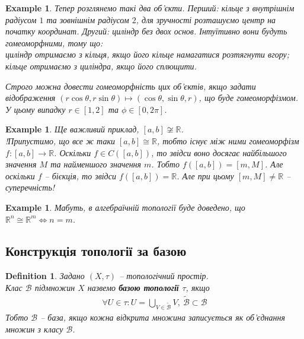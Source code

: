 \documentclass[a4paper, 10pt]{article}
\theoremstyle{theoremdd}
\newtheorem{definition}[theorem]{Definition}
\newtheorem{example}[theorem]{Example}
\begin{document}
\begin{example}
Тепер розглянемо такі два об'єкти. Перший: кільце з внутрішнім радіусом $1$ та зовнішнім радіусом $2$, для зручності розташуємо центр на початку координат. Другий: циліндр без двох основ. Інтуїтивно вони будуть гомеоморфними, тому що:\\
циліндр отримаємо з кільця, якщо його кільце намагатися розтягнути вгору;\\
кільце отримаємо з циліндра, якщо його сплющити.
\begin{figure}[H]
\centering
{}
\qquad
{}
\end{figure}
\noindent
Строго можна довести гомеоморфність цих об'єктів, якщо задати відображення $(r \cos \theta, r \sin \theta) \mapsto (\cos \theta, \sin \theta,r)$, що буде гомеоморфізмом. У цьому випадку $r \in [1,2]$ та $\phi \in [0,2\pi]$.
\end{example}

\begin{example}
Ще важливий приклад, $[a,b] \not\cong \mathbb{R}$.\\
!Припустимо, що все ж таки $[a,b] \cong \mathbb{R}$, тобто існує між ними гомеоморфізм $f \colon [a,b] \to \mathbb{R}$. Оскільки $f \in C([a,b])$, то звідси воно досягає найбільшого значення $M$ та найменшого значення $m$. Тобто $f([a,b]) = [m,M]$. Але оскільки $f$ -- бієкція, то звідси $f([a,b]) = \mathbb{R}$. Але при цьому $[m,M] \neq \mathbb{R}$ -- суперечність!
\end{example}

\begin{example}
Мабуть, в алгебраїчній топології буде доведено, що $\mathbb{R}^n \cong \mathbb{R}^m \iff n = m$.
\end{example}

\subsection{Конструкція топології за базою}
\begin{definition}
Задано $(X,\tau)$ -- топологічний простір.\\
Клас $\mathcal{B}$ підмножин $X$ назвемо \textbf{базою топології $\tau$}, якщо
\begin{align*}
\forall U \in \tau: U = \bigcup_{V \in \mathcal{\tilde{B}}} V,\ \mathcal{\tilde{B}} \subset \mathcal{B}
\end{align*}
Тобто $\mathcal{B}$ -- база, якщо кожна відкрита множина записується як об'єднання множин з класу $\mathcal{B}$.
\end{definition}
\end{document}
